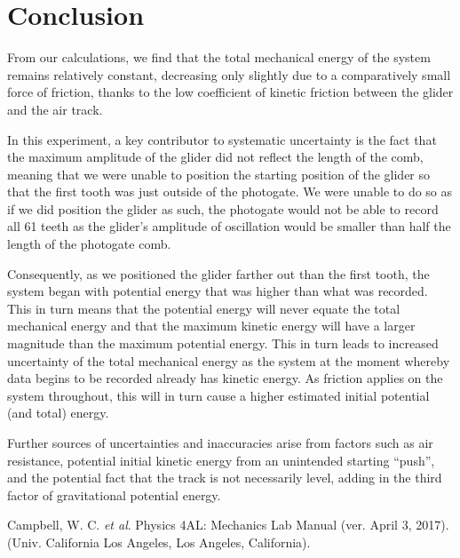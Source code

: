 \documentclass[titlepage]{article}
\begin{document}
\pagebreak

\section{Conclusion}
From our calculations, we find that the total mechanical energy of the system remains relatively constant, decreasing only slightly due to a comparatively small force of friction, thanks to the low coefficient of kinetic friction between the glider and the air track.

In this experiment, a key contributor to systematic uncertainty is the fact that the maximum amplitude of the glider did not reflect the length of the comb, meaning that we were unable to position the starting position of the glider so that the first tooth was just outside of the photogate. We were unable to do so as if we did position the glider as such, the photogate would not be able to record all 61 teeth as the glider's amplitude of oscillation would be smaller than half the length of the photogate comb.

Consequently, as we positioned the glider farther out than the first tooth, the system began with potential energy that was higher than what was recorded. This in turn means that the potential energy will never equate the total mechanical energy and that the maximum kinetic energy will have a larger magnitude than the maximum potential energy. This in turn leads to increased uncertainty of the total mechanical energy as the system at the moment whereby data begins to be recorded already has kinetic energy. As friction applies on the system throughout, this will in turn cause a higher estimated initial potential (and total) energy.

Further sources of uncertainties and inaccuracies arise from factors such as air resistance, potential initial kinetic energy from an unintended starting ``push'', and the potential fact that the track is not necessarily level, adding in the third factor of gravitational potential energy.

\pagebreak

\begin{thebibliography}{1}
Campbell, W. C. \textit{et al}. Physics 4AL: Mechanics Lab Manual (ver. April 3, 2017).
(Univ. California Los Angeles, Los Angeles, California).
\end{thebibliography}
\end{document}
